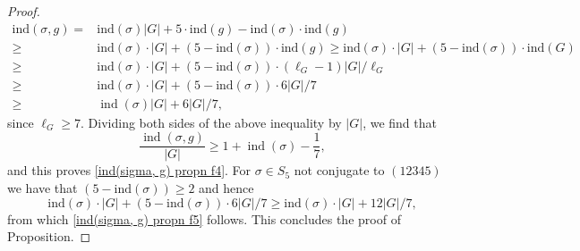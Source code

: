 \documentclass[11pt]{amsart}
\newcommand{\ind}{\mathrm{ind}}
\newcommand{\op}[1]{\operatorname{#1}}
\numberwithin{equation}{section}
\begin{document}
\begin{proof}
\[\begin{split}
    \ind(\sigma, g) = & \ind(\sigma)|G| + 5\cdot\ind(g) - \ind(\sigma)\cdot\ind(g) \\
   \geq  & \ind(\sigma)\cdot|G| + (5-\ind(\sigma))\cdot\ind(g) \geq \ind(\sigma)\cdot |G| + (5-\ind(\sigma))\cdot \ind(G) \\
   \geq  & \ind(\sigma)\cdot |G| + (5-\ind(\sigma))\cdot (\ell_G-1)|G|/\ell_G \\
   \geq & \ind(\sigma)\cdot |G| + (5-\ind(\sigma))\cdot 6|G|/7 \\
   \geq & \op{ind}(\sigma) |G|+6|G|/7,
\end{split} \] since $\ell_G \geq 7$. Dividing both sides of the above inequality by $|G|$, we find that 
\[\frac{\op{ind}(\sigma, g)}{|G|}\geq 1+\op{ind}(\sigma) -\frac{1}{7},\] and this proves \eqref{ind(sigma, g) propn f4}. 
For $\sigma \in S_5$ not conjugate to $(12345)$ we have that $(5-\ind(\sigma))\geq 2$ and hence \[\ind(\sigma)\cdot |G| + (5-\ind(\sigma))\cdot 6|G|/7 \geq \ind(\sigma)\cdot |G| + 12|G|/7,\] from which \eqref{ind(sigma, g) propn f5} follows. This concludes the proof of Proposition.
\end{proof}
\end{document}

